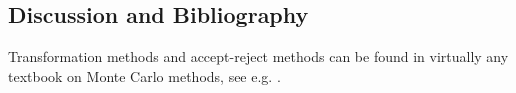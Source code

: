 \subsection{Discussion and Bibliography}

Transformation methods and accept-reject methods can be found in virtually any textbook on Monte Carlo methods, see e.g.  \cite{robert2013monte}. 





